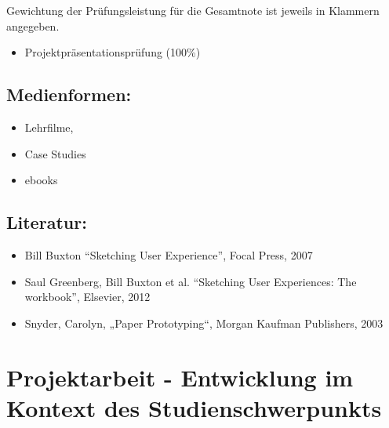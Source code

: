 Gewichtung der Prüfungsleistung für die Gesamtnote ist jeweils in
Klammern angegeben.

\begin{itemize}
\tightlist
\item
  Projektpräsentationsprüfung (100\%)
\end{itemize}

\section*{Medienformen:}\label{medienformen-7}

\begin{itemize}
\tightlist
\item
  Lehrfilme,
\item
  Case Studies
\item
  ebooks
\end{itemize}

\section*{Literatur:}\label{literatur-7}

\begin{itemize}
\tightlist
\item
  Bill Buxton ``Sketching User Experience'', Focal Press, 2007
\item
  Saul Greenberg, Bill Buxton et al. ``Sketching User Experiences: The
  workbook'', Elsevier, 2012
\item
  Snyder, Carolyn, „Paper Prototyping``, Morgan Kaufman Publishers, 2003
\end{itemize}

\chapter{Projektarbeit - Entwicklung im Kontext des
Studienschwerpunkts}\label{projektarbeit---entwicklung-im-kontext-des-studienschwerpunkts}

